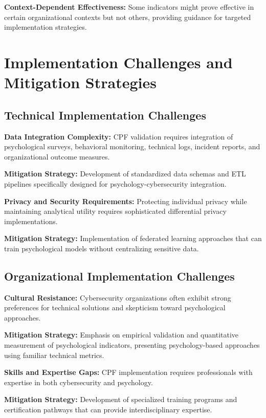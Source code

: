 \documentclass[11pt,a4paper]{article}
\begin{document}
\textbf{Context-Dependent Effectiveness:} Some indicators might prove effective in certain organizational contexts but not others, providing guidance for targeted implementation strategies.

\section{Implementation Challenges and Mitigation Strategies}

\subsection{Technical Implementation Challenges}

\textbf{Data Integration Complexity:} CPF validation requires integration of psychological surveys, behavioral monitoring, technical logs, incident reports, and organizational outcome measures.

\textbf{Mitigation Strategy:} Development of standardized data schemas and ETL pipelines specifically designed for psychology-cybersecurity integration.

\textbf{Privacy and Security Requirements:} Protecting individual privacy while maintaining analytical utility requires sophisticated differential privacy implementations.

\textbf{Mitigation Strategy:} Implementation of federated learning approaches that can train psychological models without centralizing sensitive data.

\subsection{Organizational Implementation Challenges}

\textbf{Cultural Resistance:} Cybersecurity organizations often exhibit strong preferences for technical solutions and skepticism toward psychological approaches.

\textbf{Mitigation Strategy:} Emphasis on empirical validation and quantitative measurement of psychological indicators, presenting psychology-based approaches using familiar technical metrics.

\textbf{Skills and Expertise Gaps:} CPF implementation requires professionals with expertise in both cybersecurity and psychology.

\textbf{Mitigation Strategy:} Development of specialized training programs and certification pathways that can provide interdisciplinary expertise.
\end{document}
